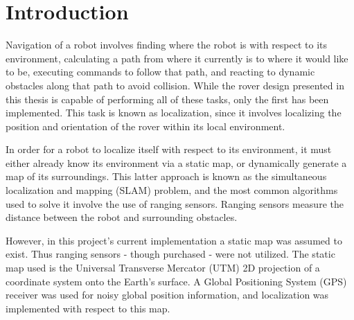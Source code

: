 \chapter*{Introduction}

Navigation of a robot involves finding where the robot is with respect to its environment, calculating a path from where it currently is to where it would like to be, executing commands to follow that path, and reacting to dynamic obstacles along that path to avoid collision. While the rover design presented in this thesis is capable of performing all of these tasks, only the first has been implemented. This task is known as  localization, since it involves localizing the position and orientation of the rover within its local environment.

In order for a robot to localize itself with respect to its environment, it must either already know its environment via a static map, or dynamically generate a map of its surroundings. This latter approach is known as the simultaneous localization and mapping (SLAM) problem, and the most common algorithms used to solve it involve the use of ranging sensors. Ranging sensors measure the distance between the robot and surrounding obstacles.

However, in this project's current implementation a static map was assumed to exist. Thus ranging sensors - though purchased - were not utilized. The static map used is the Universal Transverse Mercator (UTM) 2D projection of a coordinate system onto the Earth's surface. A Global Positioning System (GPS) receiver was used for noisy global position information, and localization was implemented with respect to this map. 




